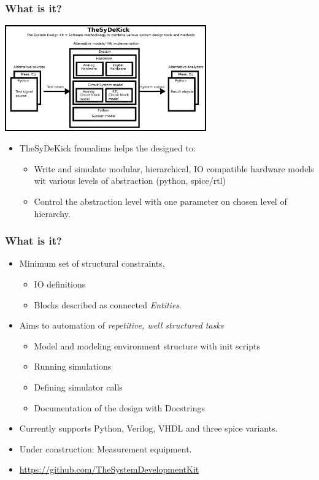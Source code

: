 \documentclass[logo=bluequo,normaltitle]{aaltoslides}
\newcommand{\sectname}{Section Name}
\begin{document}
\renewcommand{\sectname}{What is it?}
\begin{frame}[t]
    \frametitle{\sectname}
    \centering
        \includegraphics[width=0.65\textwidth]{Pics/TheSDK_block_diagram.eps}
        \begin{itemize}
            \item TheSyDeKick fromalims helps the designed to: 
            \begin{itemize}
                \item Write and simulate modular, hierarchical, IO compatible
                    hardware models wit various levels of abstraction (python,
                    spice/rtl)
                \item Control the abstraction level with one parameter on
                    chosen level of hierarchy.
            \end{itemize}
        \end{itemize}
\end{frame}


\begin{frame}[t]
    \frametitle{\sectname}
    \begin{itemize}
        \item Minimum set of structural constraints, 
            \begin{itemize}
                \item IO definitions
                \item Blocks described as connected \emph{Entities}.
            \end{itemize}
        \item Aims to automation of \emph{repetitive, well structured tasks}
            \begin{itemize}
                \item Model and modeling environment structure with init scripts
                \item Running simulations
                \item Defining simulator calls
                \item Documentation of the design with Docstrings
            \end{itemize}
        \item Currently supports Python, Verilog, VHDL and three spice
            variants.
        \item Under construction: Measurement equipment.
        \item \url{https://github.com/TheSystemDevelopmentKit}
    \end{itemize}
\end{frame}
\end{document}
